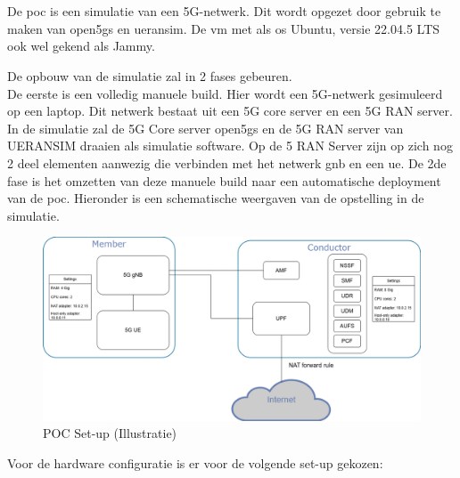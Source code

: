 \chapter{}%
\label{ch:poc}

\section{}%
\label{sec:sim}%
De \gls{poc} is een simulatie van een 5G-netwerk. Dit wordt opgezet door gebruik te maken van \gls{open5gs} en \gls{ueransim}. De \gls{vm} met als \gls{os} Ubuntu, versie 22.04.5 LTS ook wel gekend als Jammy. 

De opbouw van de simulatie zal in 2 fases gebeuren. \\De eerste is een volledig manuele build. Hier wordt een 5G-netwerk gesimuleerd op een laptop. Dit netwerk bestaat uit een 5G core server en een 5G RAN server. In de simulatie zal de 5G Core server \gls{open5gs} en de 5G RAN server van UERANSIM draaien als simulatie software. Op de 5 RAN Server zijn op zich nog 2 deel elementen aanwezig die verbinden met het netwerk \gls{gnb} en een \gls{ue}. De 2de fase is het omzetten van deze manuele build naar een automatische deployment van de \gls{poc}. Hieronder is een schematische weergaven van de opstelling in de simulatie. 

\begin{figure}[H]
    \includegraphics[width=\linewidth]{../graphics/POC-setup.png}
    \caption{POC Set-up (Illustratie)}
    \label{fig:poc-setup}
\end{figure}

Voor de hardware configuratie is er voor de volgende set-up gekozen:

